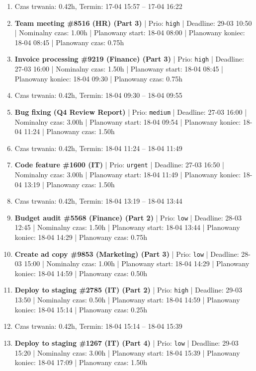 {\begin{enumerate}
  \item [\textbf{PRZERWA}] Czas trwania: 0.42h, Termin: 17-04 15:57 -- 17-04 16:22
  \item [\textbf{14624}] \textbf{Team meeting \#8516 (HR) (Part 3)} | Prio: \texttt{high} | Deadline: 29-03 10:50 | Nominalny czas: 1.00h | Planowany start: 18-04 08:00 | Planowany koniec: 18-04 08:45 | Planowany czas: 0.75h
  \item [\textbf{14622}] \textbf{Invoice processing \#9219 (Finance) (Part 3)} | Prio: \texttt{high} | Deadline: 27-03 16:00 | Nominalny czas: 1.50h | Planowany start: 18-04 08:45 | Planowany koniec: 18-04 09:30 | Planowany czas: 0.75h
  \item [\textbf{PRZERWA}] Czas trwania: 0.42h, Termin: 18-04 09:30 -- 18-04 09:55
  \item [\textbf{14647}] \textbf{Bug fixing (Q4 Review Report)} | Prio: \texttt{medium} | Deadline: 27-03 16:00 | Nominalny czas: 3.00h | Planowany start: 18-04 09:54 | Planowany koniec: 18-04 11:24 | Planowany czas: 1.50h
  \item [\textbf{PRZERWA}] Czas trwania: 0.42h, Termin: 18-04 11:24 -- 18-04 11:49
  \item [\textbf{14605}] \textbf{Code feature \#1600 (IT)} | Prio: \texttt{urgent} | Deadline: 27-03 16:50 | Nominalny czas: 3.00h | Planowany start: 18-04 11:49 | Planowany koniec: 18-04 13:19 | Planowany czas: 1.50h
  \item [\textbf{PRZERWA}] Czas trwania: 0.42h, Termin: 18-04 13:19 -- 18-04 13:44
  \item [\textbf{14693}] \textbf{Budget audit \#5568 (Finance) (Part 2)} | Prio: \texttt{low} | Deadline: 28-03 12:45 | Nominalny czas: 1.50h | Planowany start: 18-04 13:44 | Planowany koniec: 18-04 14:29 | Planowany czas: 0.75h
  \item [\textbf{14679}] \textbf{Create ad copy \#9853 (Marketing) (Part 3)} | Prio: \texttt{low} | Deadline: 28-03 15:00 | Nominalny czas: 1.00h | Planowany start: 18-04 14:29 | Planowany koniec: 18-04 14:59 | Planowany czas: 0.50h
  \item [\textbf{14623}] \textbf{Deploy to staging \#2785 (IT) (Part 2)} | Prio: \texttt{high} | Deadline: 29-03 13:50 | Nominalny czas: 0.50h | Planowany start: 18-04 14:59 | Planowany koniec: 18-04 15:14 | Planowany czas: 0.25h
  \item [\textbf{PRZERWA}] Czas trwania: 0.42h, Termin: 18-04 15:14 -- 18-04 15:39
  \item [\textbf{14686}] \textbf{Deploy to staging \#1267 (IT) (Part 4)} | Prio: \texttt{low} | Deadline: 29-03 15:20 | Nominalny czas: 3.00h | Planowany start: 18-04 15:39 | Planowany koniec: 18-04 17:09 | Planowany czas: 1.50h

\end{enumerate}}
